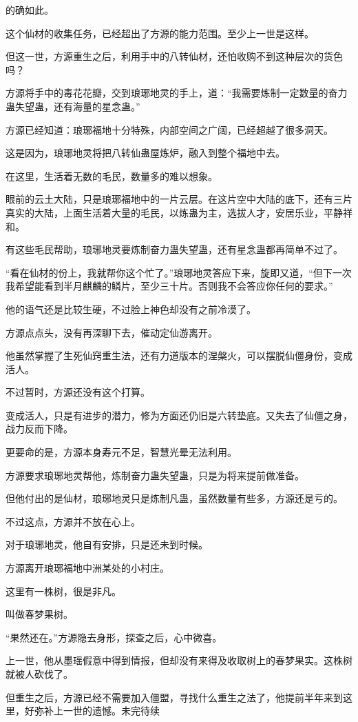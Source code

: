 \begin{this_body}
的确如此。

这个仙材的收集任务，已经超出了方源的能力范围。至少上一世是这样。

但这一世，方源重生之后，利用手中的八转仙材，还怕收购不到这种层次的货色吗？

方源将手中的毒花花瓣，交到琅琊地灵的手上，道：“我需要炼制一定数量的奋力蛊失望蛊，还有海量的星念蛊。”

方源已经知道：琅琊福地十分特殊，内部空间之广阔，已经超越了很多洞天。

这是因为，琅琊地灵将把八转仙蛊屋炼炉，融入到整个福地中去。

在这里，生活着无数的毛民，数量多的难以想象。

眼前的云土大陆，只是琅琊福地中的一片云层。在这片空中大陆的底下，还有三片真实的大陆，上面生活着大量的毛民，以炼蛊为主，选拔人才，安居乐业，平静祥和。

有这些毛民帮助，琅琊地灵要炼制奋力蛊失望蛊，还有星念蛊都再简单不过了。

“看在仙材的份上，我就帮你这个忙了。”琅琊地灵答应下来，旋即又道，“但下一次我希望能看到半月麒麟的鳞片，至少三十片。否则我不会答应你任何的要求。”

他的语气还是比较生硬，不过脸上神色却没有之前冷漠了。

方源点点头，没有再深聊下去，催动定仙游离开。

他虽然掌握了生死仙窍重生法，还有力道版本的涅槃火，可以摆脱仙僵身份，变成活人。

不过暂时，方源还没有这个打算。

变成活人，只是有进步的潜力，修为方面还仍旧是六转垫底。又失去了仙僵之身，战力反而下降。

更要命的是，方源本身寿元不足，智慧光晕无法利用。

方源要求琅琊地灵帮他，炼制奋力蛊失望蛊，只是为将来提前做准备。

但他付出的是仙材，琅琊地灵只是炼制凡蛊，虽然数量有些多，方源还是亏的。

不过这点，方源并不放在心上。

对于琅琊地灵，他自有安排，只是还未到时候。

方源离开琅琊福地中洲某处的小村庄。

这里有一株树，很是非凡。

叫做春梦果树。

“果然还在。”方源隐去身形，探查之后，心中微喜。

上一世，他从墨瑶假意中得到情报，但却没有来得及收取树上的春梦果实。这株树就被人砍伐了。

但重生之后，方源已经不需要加入僵盟，寻找什么重生之法了，他提前半年来到这里，好弥补上一世的遗憾。未完待续

\end{this_body}

